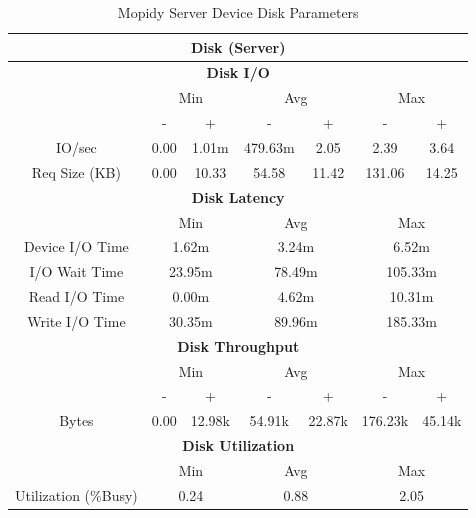 \documentclass[11pt,a4paper,headinclude=false,footinclude=false]{scrreprt}
\begin{document}
\begin{table}[H]
\centering
    \begin{tabular}{||c|c|c|c|c|c|c||}
    \hline
    \multicolumn{7}{|c|}{\textbf{Disk (Server)}} \\
    \hline
    \multicolumn{7}{|c|}{\textbf{Disk I/O}} \\
    \hline\hline
      & \multicolumn{2}{|c|}{Min} & \multicolumn{2}{|c|}{Avg} & \multicolumn{2}{|c|}{Max} \\
    \hline
      & - & + & - & + & - & + \\
    \hline
    IO/sec & 0.00 & 1.01m & 479.63m & 2.05 & 2.39 & 3.64 \\
    \hline
    Req Size (KB) & 0.00 & 10.33 & 54.58 & 11.42 & 131.06 & 14.25 \\
    \hline\hline
    \multicolumn{7}{|c|}{\textbf{Disk Latency}} \\
    \hline\hline
      & \multicolumn{2}{|c|}{Min} & \multicolumn{2}{|c|}{Avg} & \multicolumn{2}{|c|}{Max} \\
    \hline
    Device I/O Time  & \multicolumn{2}{|c|}{1.62m} & \multicolumn{2}{|c|}{3.24m} & \multicolumn{2}{|c|}{6.52m} \\
    \hline
    I/O Wait Time  & \multicolumn{2}{|c|}{23.95m} & \multicolumn{2}{|c|}{78.49m} & \multicolumn{2}{|c|}{105.33m} \\
    \hline
    Read I/O Time  & \multicolumn{2}{|c|}{0.00m} & \multicolumn{2}{|c|}{4.62m} & \multicolumn{2}{|c|}{10.31m} \\
    \hline
    Write I/O Time  & \multicolumn{2}{|c|}{30.35m} & \multicolumn{2}{|c|}{89.96m} & \multicolumn{2}{|c|}{185.33m} \\
    \hline\hline
    \multicolumn{7}{|c|}{\textbf{Disk Throughput}} \\
    \hline\hline
      & \multicolumn{2}{|c|}{Min} & \multicolumn{2}{|c|}{Avg} & \multicolumn{2}{|c|}{Max} \\
    \hline
      & - & + & - & + & - & + \\
    \hline
    Bytes & 0.00 & 12.98k & 54.91k & 22.87k & 176.23k & 45.14k \\
    \hline\hline
    \multicolumn{7}{|c|}{\textbf{Disk Utilization}} \\
    \hline\hline
      & \multicolumn{2}{|c|}{Min} & \multicolumn{2}{|c|}{Avg} & \multicolumn{2}{|c|}{Max} \\
    \hline
    Utilization (\%Busy)  & \multicolumn{2}{|c|}{0.24} & \multicolumn{2}{|c|}{0.88} & \multicolumn{2}{|c|}{2.05} \\
    \hline\hline
    \end{tabular}
    \caption{Mopidy Server Device Disk Parameters}
    \label{MopidyserverDiskTab}
\end{table}
\end{document}
